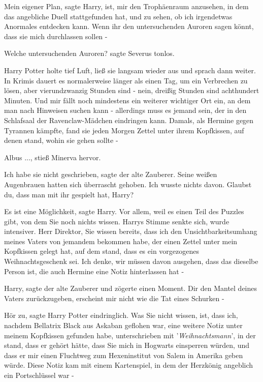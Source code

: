 \glqq Mein eigener Plan\grqq{}, sagte Harry, \glqq ist, mir den Trophäenraum
anzusehen, in dem das angebliche Duell stattgefunden hat, und zu sehen, ob ich
irgendetwas Anormales entdecken kann. Wenn ihr den untersuchenden Auroren sagen
könnt, dass sie mich durchlassen sollen -\grqq{}

\glqq Welche untersuchenden Auroren?\grqq{} sagte Severus tonlos.

Harry Potter holte tief Luft, ließ sie langsam wieder aus und sprach dann
weiter. \glqq In Krimis dauert es normalerweise länger als einen Tag, um ein
Verbrechen zu lösen, aber vierundzwanzig Stunden sind - nein, dreißig Stunden
sind achthundert Minuten. Und mir fällt noch mindestens ein weiterer wichtiger
Ort ein, an dem man nach Hinweisen suchen kann - allerdings muss es jemand sein,
der in den Schlafsaal der Ravenclaw-Mädchen eindringen kann. Damals, als Hermine
gegen Tyrannen kämpfte, fand sie jeden Morgen Zettel unter ihrem Kopfkissen, auf
denen stand, wohin sie gehen sollte -\grqq{}

\glqq Albus ...\grqq{}, stieß Minerva hervor.

\glqq Ich habe sie nicht geschrieben\grqq{}, sagte der alte Zauberer. Seine
weißen Augenbrauen hatten sich überrascht gehoben. \glqq Ich wusste nichts
davon. Glaubst du, dass man mit ihr gespielt hat, Harry?\grqq{}

\glqq Es ist eine Möglichkeit\grqq{}, sagte Harry. \glqq Vor allem, weil es
einen Teil des Puzzles gibt, von dem Sie noch nichts wissen.\grqq{} Harrys
Stimme senkte sich, wurde intensiver. \glqq Herr Direktor, Sie wissen bereits,
dass ich den Unsichtbarkeitsumhang meines Vaters von jemandem bekommen habe, der
einen Zettel unter mein Kopfkissen gelegt hat, auf dem stand, dass es ein
vorgezogenes Weihnachtsgeschenk sei. Ich denke, wir müssen davon ausgehen, dass
das dieselbe Person ist, die auch Hermine eine Notiz hinterlassen hat -\grqq{}

\glqq Harry\grqq{}, sagte der alte Zauberer und zögerte einen Moment. \glqq Dir
den Mantel deines Vaters zurückzugeben, erscheint mir nicht wie die Tat eines
Schurken -\grqq{}

\glqq Hör zu\grqq{}, sagte Harry Potter eindringlich. \glqq Was Sie nicht
wissen, ist, dass ich, nachdem Bellatrix Black aus Askaban geflohen war, eine
weitere Notiz unter meinem Kopfkissen gefunden habe, unterschrieben mit
'\emph{Weihnachtsmann}', in der stand, dass er gehört hätte, dass Sie mich in
Hogwarts einsperren würden, und dass er mir einen Fluchtweg zum Hexeninstitut
von Salem in Amerika geben würde. Diese Notiz kam mit einem Kartenspiel, in dem
der Herzkönig angeblich ein Portschlüssel war -\grqq{}

